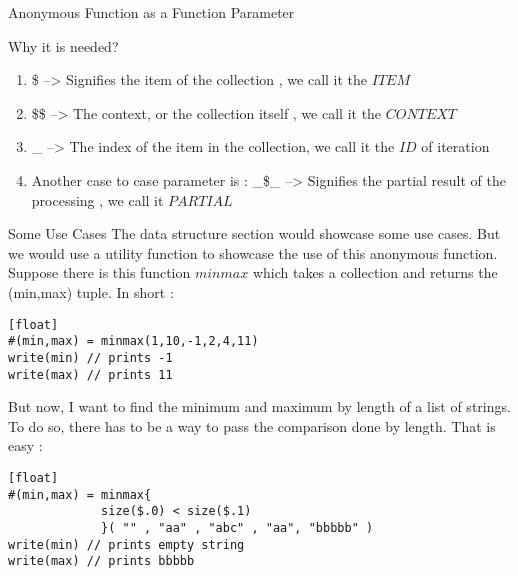 \begin{section}{Anonymous Function as a Function Parameter}
\begin{subsection}{Why it is needed?}
\begin{enumerate}
\item{ \$ --> Signifies the item of the collection , we call it the $ITEM$ }
\item{ \$\$ --> The context, or the collection itself , we call it the $CONTEXT$} 
\item{ \_ --> The index of the item in the collection, we call it the $ID$ of iteration } 
\item{ Another case to case parameter is :
     \_\$\_ --> Signifies the partial result of the processing , we call it $PARTIAL$ }
\end{enumerate}

\end{subsection}

\begin{subsection}{Some Use Cases}
The data structure section would showcase some use cases. 
But we would use a utility function to showcase the use of this anonymous function.
Suppose there is this function $minmax$ which takes a collection and returns the (min,max) tuple.
In short :

\begin{lstlisting}[style=JexlStyle][float]
#(min,max) = minmax(1,10,-1,2,4,11)
write(min) // prints -1
write(max) // prints 11    
\end{lstlisting}
But now, I want to find the minimum and maximum by length of a list of strings.
To do so, there has to be a way to pass the comparison done by length.
That is easy :

\begin{lstlisting}[style=JexlStyle][float]
#(min,max) = minmax{
             size($.0) < size($.1) 
             }( "" , "aa" , "abc" , "aa", "bbbbb" )
write(min) // prints empty string 
write(max) // prints bbbbb    
\end{lstlisting}

\end{subsection}

\end{section}

